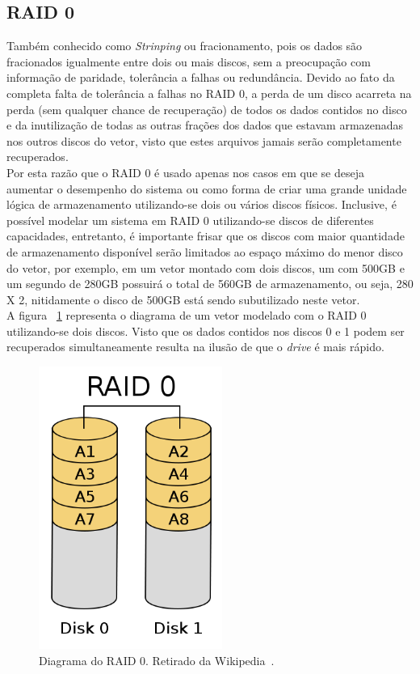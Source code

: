 		\subsection{RAID 0}
		
		Também conhecido como \textit{Strinping} ou fracionamento, pois os dados são fracionados igualmente entre dois ou mais discos, sem a preocupação com informação de paridade, tolerância a falhas ou redundância. Devido ao fato da completa falta de tolerância a falhas no RAID 0, a perda de um disco acarreta na perda (sem qualquer chance de recuperação) de todos os dados contidos no disco e da inutilização de todas as outras frações dos dados que estavam armazenadas nos outros discos do vetor, visto que estes arquivos jamais serão completamente recuperados.
		\\
		
		Por esta razão que o RAID 0 é usado apenas nos casos em que se deseja aumentar o desempenho do sistema ou como forma de criar uma grande unidade lógica de armazenamento utilizando-se dois ou vários discos físicos. Inclusive, é possível modelar um sistema em RAID 0 utilizando-se discos de diferentes capacidades, entretanto, é importante frisar que os discos com maior quantidade de armazenamento disponível serão limitados ao espaço máximo do menor disco do vetor, por exemplo, em um vetor montado com dois discos, um com 500GB e um segundo de 280GB possuirá o total de 560GB de armazenamento, ou seja, 280 X 2, nitidamente o disco de 500GB está sendo subutilizado neste vetor. \\
		
		A figura ~\ref{fig:raid0} representa o diagrama de um vetor modelado com o RAID 0 utilizando-se dois discos. Visto que os dados contidos nos discos 0 e 1 podem ser recuperados simultaneamente resulta na ilusão de que o \textit{drive} é mais rápido.\\
		
		\begin{figure}[htb]
			\begin{center}
				
				\includegraphics[clip,width=6.0cm]{images/RAID_0.png}
				\caption{Diagrama do RAID 0. Retirado da Wikipedia~\citep{wikiRAIDlevels}.}
				\label{fig:raid0}
			\end{center}
		\end{figure} 
		
